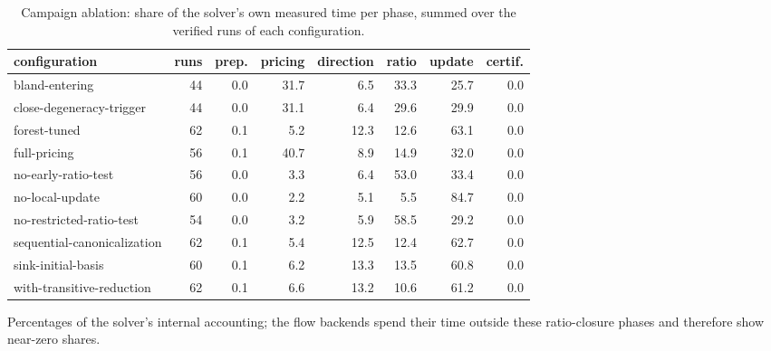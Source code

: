 \begin{table}[tbp]
\centering
\caption{Campaign ablation: share of the solver's own measured time per phase, summed over the verified runs of each configuration.}
\label{tab:ablation-breakdown}
\small
\begin{adjustbox}{max width=\textwidth}
\begin{tabular}{lrrrrrrr}
\toprule
configuration & runs & prep. & pricing & direction & ratio & update & certif. \\
\midrule
bland-entering & 44 & 0.0 & 31.7 & 6.5 & 33.3 & 25.7 & 0.0 \\
close-degeneracy-trigger & 44 & 0.0 & 31.1 & 6.4 & 29.6 & 29.9 & 0.0 \\
forest-tuned & 62 & 0.1 & 5.2 & 12.3 & 12.6 & 63.1 & 0.0 \\
full-pricing & 56 & 0.1 & 40.7 & 8.9 & 14.9 & 32.0 & 0.0 \\
no-early-ratio-test & 56 & 0.0 & 3.3 & 6.4 & 53.0 & 33.4 & 0.0 \\
no-local-update & 60 & 0.0 & 2.2 & 5.1 & 5.5 & 84.7 & 0.0 \\
no-restricted-ratio-test & 54 & 0.0 & 3.2 & 5.9 & 58.5 & 29.2 & 0.0 \\
sequential-canonicalization & 62 & 0.1 & 5.4 & 12.5 & 12.4 & 62.7 & 0.0 \\
sink-initial-basis & 60 & 0.1 & 6.2 & 13.3 & 13.5 & 60.8 & 0.0 \\
with-transitive-reduction & 62 & 0.1 & 6.6 & 13.2 & 10.6 & 61.2 & 0.0 \\
\bottomrule
\end{tabular}
\end{adjustbox}
\par\vspace{2pt}\footnotesize Percentages of the solver's internal accounting; the flow backends spend their time outside these ratio-closure phases and therefore show near-zero shares.
\end{table}
